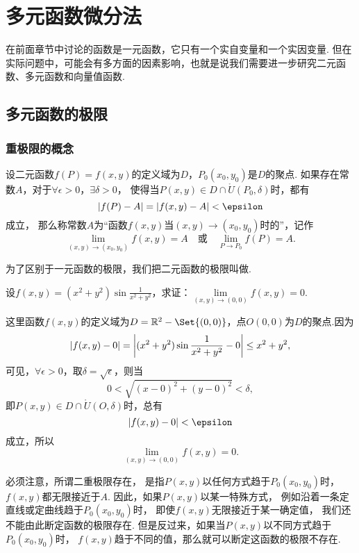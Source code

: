 \chapter{多元函数微分法}
在前面章节中讨论的函数是一元函数，它只有一个实自变量和一个实因变量.
但在实际问题中，可能会有多方面的因素影响，也就是说我们需要进一步研究二元函数、多元函数和向量值函数.

\section{多元函数的极限}
\subsection{重极限的概念}
\begin{definition}
设二元函数\(f(P)=f(x,y)\)的定义域为\(D\)，\(P_0(x_0,y_0)\)是\(D\)的聚点.
如果存在常数\(A\)，对于\(\forall \epsilon > 0\)，\(\exists \delta > 0\)，
使得当\(P(x,y) \in D \cap \mathring{U}(P_0,\delta)\)时，都有\[
	\abs{f(P)-A} = \abs{f(x,y)-A} < \epsilon
\]成立，
那么称常数\(A\)为“函数\(f(x,y)\)当\((x,y)\to(x_0,y_0)\)时的”，记作\[
	\lim\limits_{(x,y)\to(x_0,y_0)} f(x,y) = A
	\quad\text{或}\quad
	\lim\limits_{P \to P_0} f(P) = A.
\]

为了区别于一元函数的极限，我们把二元函数的极限叫做.
\end{definition}

\begin{example}
设\(f(x,y) = (x^2+y^2) \sin\frac{1}{x^2+y^2}\)，求证：\(\lim\limits_{(x,y)\to(0,0)} f(x,y) = 0\).
\begin{solution}
这里函数\(f(x,y)\)的定义域为\(D = \mathbb{R}^2 - \Set{(0,0)}\)，点\(O(0,0)\)为\(D\)的聚点.因为\[
\abs{f(x,y)-0}
= \abs{(x^2+y^2) \sin\frac{1}{x^2+y^2} - 0}
\leq x^2+y^2,
\]可见，\(\forall\epsilon>0\)，取\(\delta=\sqrt{\epsilon}\)，则当\[
0 < \sqrt{(x-0)^2+(y-0)^2} < \delta,
\]即\(P(x,y) \in D \cap \mathring{U}(O,\delta)\)时，总有\[
\abs{f(x,y)-0} < \epsilon
\]成立，所以\[
\lim\limits_{(x,y)\to(0,0)} f(x,y) = 0.
\]
\end{solution}
\end{example}

必须注意，所谓二重极限存在，
是指\(P(x,y)\)以任何方式趋于\(P_0(x_0,y_0)\)时，\(f(x,y)\)都无限接近于\(A\).
因此，如果\(P(x,y)\)以某一特殊方式，
例如沿着一条定直线或定曲线趋于\(P_0(x_0,y_0)\)时，
即使\(f(x,y)\)无限接近于某一确定值，
我们还不能由此断定函数的极限存在.
但是反过来，如果当\(P(x,y)\)以不同方式趋于\(P_0(x_0,y_0)\)时，
\(f(x,y)\)趋于不同的值，那么就可以断定这函数的极限不存在.

